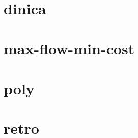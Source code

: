 \documentclass[portrait,twocolumn,letterpaper]{article}
\begin{document}
\section{dinica}


%

\section{max-flow-min-cost}


\section{poly}


%

\section{retro}



\end{document}
